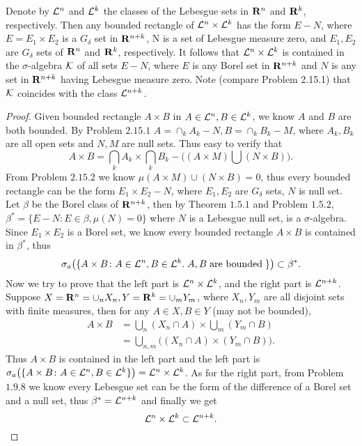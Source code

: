 \begin{pro}%
	Denote by $\mathcal{L}^n$ and $\mathcal{L}^k$ the classes of the Lebesgue sets in $\mathbf{R}^n$ and $\mathbf{R}^k$, respectively. Then any bounded rectangle of $\mathcal{L}^n\times\mathcal{L}^k$ has the form $E-N$, where $E=E_1\times E_2$ is a $G_{\delta}$ set in $\mathbf{R}^{n+k}$, N is a set of Lebesgue measure zero, and $E_1,E_2$ are $G_{\delta}$ sets of $\mathbf{R}^n$ and $\mathbf{R}^k$, respectively. It follows that $\mathcal{L}^n\times\mathcal{L}^k$ is contained in the $\sigma$-algebra $\mathcal{K}$ of all sets $E-N$, where $E$ is any Borel set in $\mathbf{R}^{n+k}$ and $N$ is any set in $\mathbf{R}^{n+k}$ having Lebesgue measure zero. Note (compare Problem 2.15.1) that $\mathcal{K}$ coincides with the class $\mathcal{L}^{n+k}$.
\end{pro}
\begin{proof}
	Given bounded rectangle $A\times B$ in $A\in\mathcal{L}^n, B\in\mathcal{L}^k$, we know $A$ and $B$ are both bounded. By Problem $2.15.1$ $A=\cap_k A_k-N, B=\cap_k B_k-M$, where $A_k,B_k$ are all open sets and $N,M$ are null sets. Thus easy to verify that
	\[A\times B=\bigcap_k A_k\times\bigcap_k B_k-\big((A\times M)\bigcup(N\times B)\big).\]
	From Problem $2.15.2$ we know $\mu(A\times M)\cup(N\times B)=0$, thus every bounded rectangle can be the form $E_1\times E_2-N$, where $E_1,E_2$ are $G_{\delta}$ sets, $N$ is null set. Let $\beta$ be the Borel class of $\mathbf{R}^{n+k}$, then by Theorem $1.5.1$ and Problem $1.5.2$, $\beta^*=\{E-N\colon E\in\beta,\mu(N)=0\}$ where $N$ is a Lebesgue null set, is a $\sigma$-algebra. Since $E_1\times E_2$ is a Borel set, we know every bounded rectangle $A\times B$ is contained in $\beta^*$, thus
	\[\sigma_a\big(\{A\times B\colon A\in\mathcal{L}^n,B\in\mathcal{L}^k.\;A,B\;\mbox{are bounded}\;\}\big)\subset \beta^*.\]
	Now we try to prove that the left part is $\mathcal{L}^n\times\mathcal{L}^k$, and the right part is $\mathcal{L}^{n+k}$.
	Suppose $X=\mathbf{R}^n=\cup_n X_n, Y=\mathbf{R}^k=\cup_m Y_m$, where $X_n,Y_m$ are all disjoint sets with finite measures, then for any $A\in X, B\in Y$ (may not be bounded),
	\begin{align*}
		A\times B&=\bigcup_n (X_n\cap A)\times\bigcup_m(Y_m\cap B)\\
				 &=\bigcup_{n,m} \big((X_n\cap A)\times (Y_m\cap B)\big).
	\end{align*}
	Thus $A\times B$ is contained in the left part and the left part is $\sigma_a\big(\{A\times B\colon A\in\mathcal{L}^n,B\in\mathcal{L}^k\}\big)=\mathcal{L}^n\times\mathcal{L}^k$. As for the right part, from Problem $1.9.8$ we know every Lebesgue set can be the form of the difference of a Borel set and a null set, thus $\beta^*=\mathcal{L}^{n+k}$ and finally we get
	\[\mathcal{L}^n\times \mathcal{L}^k\subset \mathcal{L}^{n+k}.\]
\end{proof}


